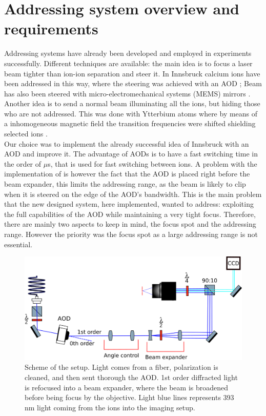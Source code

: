 \section{Addressing system overview and requirements}
\label{sec:addressing}
Addressing systems have already been developed and employed in experiments successfully. Different techniques are available: the main idea is to focus a laser beam tighter than ion-ion separation and steer it. In  Innsbruck calcium ions have been addressed in this way, where the steering was achieved with an AOD \cite{addressing}; Beam has also been steered with micro-electromechanical systems (MEMS) mirrors \cite{addressing3}. Another idea is to send a normal beam illuminating all the ions, but hiding those who are not addressed. This was done with Ytterbium atoms where by means of a inhomogeneous magnetic field the transition frequencies were shifted shielding selected ions \cite{addressing2}. \\
Our choice was to implement the already successful idea of Innsbruck with an AOD and improve it. The advantage of AODs is to have a fast switching time in the order of $\mu$s, that is used for fast switching between ions. A problem with the implementation of \cite{addressing} is however the fact that the AOD is placed right before the beam expander, this limits the addressing range, as the beam is likely to clip when it is steered on the edge of the AOD's bandwidth. This is the main problem that the new designed system, here implemented, wanted to address: exploiting the full capabilities of the AOD while maintaining a very tight focus.
Therefore, there are mainly two aspects to keep in mind, the focus spot and the addressing range. However the priority was the focus spot as a large addressing range is not essential.
\begin{figure}[H]
\centering
\includegraphics[width=\textwidth]{img/setup}
\caption{Scheme of the setup. Light comes from a fiber, polarization is cleaned, and then sent thorough the AOD. 1st order diffracted light is refocused into a beam expander, where the beam is broadened before being focus by the objective. Light blue lines represents 393 nm light coming from the ions into the imaging setup.}
\label{addressingsetup}
\end{figure}
